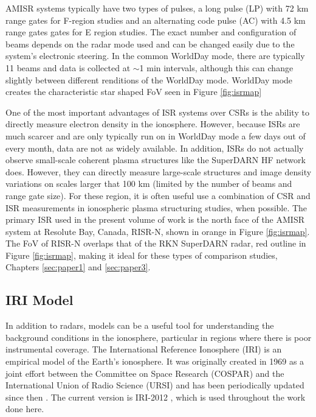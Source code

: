 AMISR systems typically have two types of pulses, a long pulse (LP) with 72 km range gates for F-region studies and an alternating code pulse (AC) with 4.5 km range gates gates for E region studies.  The exact number and configuration of beams depends on the radar mode used and can be changed easily due to the system's electronic steering.  In the common WorldDay mode, there are typically 11 beams and data is collected at \(\sim\)1 min intervals, although this can change slightly between different renditions of the WorldDay mode.  WorldDay mode creates the characteristic star shaped FoV seen in Figure \ref{fig:isrmap}

One of the most important advantages of ISR systems over CSRs is the ability to directly measure electron density in the ionosphere.  However, because ISRs are much scarcer and are only typically run on in WorldDay mode a few days out of every month, data are not as widely available.  In addition, ISRs do not actually observe small-scale coherent plasma structures like the SuperDARN HF network does.  However, they can directly measure large-scale structures and image density variations on scales larger that 100 km (limited by the number of beams and range gate size).  For these region, it is often useful use a combination of CSR and ISR measurements in ionospheric plasma structuring studies, when possible.  The primary ISR used in the present volume of work is the north face of the AMISR system at Resolute Bay, Canada, RISR-N, shown in orange in Figure \ref{fig:isrmap}.  The FoV of RISR-N overlaps that of the RKN SuperDARN radar, red outline in Figure \ref{fig:isrmap}, making it ideal for these types of comparison studies, Chapters \ref{sec:paper1} and \ref{sec:paper3}.

\subsection{IRI Model}
\label{sec:iri}
In addition to radars, models can be a useful tool for understanding the background conditions in the ionosphere, particular in regions where there is poor instrumental coverage.  The International Reference Ionosphere (IRI) is an empirical model of the Earth's ionosphere.  It was originally created in 1969 as a joint effort between the Committee on Space Research (COSPAR) and the International Union of Radio Science (URSI) and has been periodically updated since then \citep{Rawer1975,Rawer1978,Rawer1981,Bilitza1985,Bilitza1986,Bilitza1990,Bilitza1997,Bilitza2001,Bilitza2008}.  The current version is IRI-2012 \citep{Bilitza2014}, which is used throughout the work done here.

